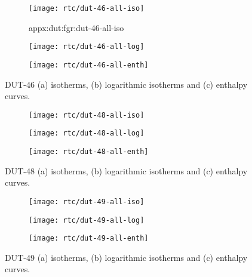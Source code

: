 \begin{figure}[H]
    \centering
    \begin{subfigure}{0.33\linewidth}
        \texttt{[image: rtc/dut-46-all-iso]}%
        \caption{appx:dut:fgr:dut-46-all-iso}
    \end{subfigure}%
    \begin{subfigure}{0.33\linewidth}
        \texttt{[image: rtc/dut-46-all-log]}%
        \caption{}
    \end{subfigure}%
    \begin{subfigure}{0.33\linewidth}
        \texttt{[image: rtc/dut-46-all-enth]}%
        \caption{}
    \end{subfigure}%
    \caption{DUT-46 (a) isotherms, (b) logarithmic isotherms and 
    (c) enthalpy curves.}%
    \label{appx:dut:fgr:dut-46-butane-rtc}
\end{figure}

\begin{figure}[H]
    \centering
    \begin{subfigure}{0.33\linewidth}
        \texttt{[image: rtc/dut-48-all-iso]}%
        \caption{}
    \end{subfigure}%
    \begin{subfigure}{0.33\linewidth}
        \texttt{[image: rtc/dut-48-all-log]}%
        \caption{}
    \end{subfigure}%
    \begin{subfigure}{0.33\linewidth}
        \texttt{[image: rtc/dut-48-all-enth]}%
        \caption{}
    \end{subfigure}%
    \caption{DUT-48 (a) isotherms, (b) logarithmic isotherms and 
    (c) enthalpy curves.}%
    \label{appx:dut:fgr:dut-48-butane-rtc}
\end{figure}

\begin{figure}[H]
    \centering
    \begin{subfigure}{0.33\linewidth}
        \texttt{[image: rtc/dut-49-all-iso]}%
        \caption{}
    \end{subfigure}%
    \begin{subfigure}{0.33\linewidth}
        \texttt{[image: rtc/dut-49-all-log]}%
        \caption{}
    \end{subfigure}%
    \begin{subfigure}{0.33\linewidth}
        \texttt{[image: rtc/dut-49-all-enth]}%
        \caption{}
    \end{subfigure}%
    \caption{DUT-49 (a) isotherms, (b) logarithmic isotherms and 
    (c) enthalpy curves.}%
    \label{appx:dut:fgr:dut-49-butane-rtc}
\end{figure}


